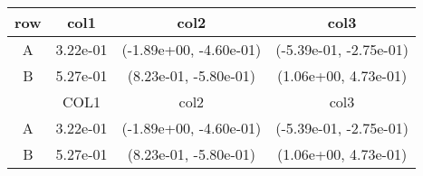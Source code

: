 \begin{tabular}{cccc}
\toprule
row&col1&col2&col3\tabularnewline
\midrule
A&3.22e-01& (-1.89e+00, -4.60e-01)& (-5.39e-01, -2.75e-01)\tabularnewline
B&5.27e-01& (8.23e-01, -5.80e-01)& (1.06e+00, 4.73e-01)\tabularnewline
\midrule
&COL1&col2&col3\tabularnewline
\midrule
A&3.22e-01& (-1.89e+00, -4.60e-01)& (-5.39e-01, -2.75e-01)\tabularnewline
B&5.27e-01& (8.23e-01, -5.80e-01)& (1.06e+00, 4.73e-01)\tabularnewline
\bottomrule
\end{tabular}
